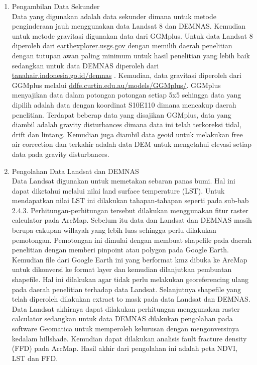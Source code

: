 \begin{enumerate}
	\item Pengambilan Data Sekunder\\
	Data yang digunakan adalah data sekunder dimana untuk metode penginderaan jauh menggunakan data Landsat 8 dan DEMNAS. Kemudian untuk metode gravitasi digunakan data dari GGMplus. Untuk data Landsat 8 diperoleh dari \href{earthexplorer.usgs.gov }{earthexplorer.usgs.gov } dengan memilih daerah penelitian dengan tutupan awan paling minimum untuk hasil penelitian yang lebih baik sedangkan untuk data DEMNAS diperoleh dari \href{tanahair.indonesia.go.id/demnas}{tanahair.indonesia.go.id/demnas} . Kemudian, data gravitasi diperoleh dari GGMplus melalui \href{ddfe.curtin.edu.au/models/GGMplus/}{ddfe.curtin.edu.au/models/GGMplus/}. GGMplus menyajikan data dalam potongan potongan setiap 5x5 sehingga data yang dipilih adalah data dengan koordinat S10E110 dimana mencakup daerah penelitian. Terdapat beberap data yang disajikan GGMplus, data yang diambil adalah gravity disturbances dimana data ini telah terkoreksi tidal, drift dan lintang. Kemudian juga diambil data geoid untuk melakukan free air correction dan terkahir adalah data DEM untuk mengetahui elevasi setiap data pada gravity disturbances.
	\vskip 5pt
	\item Pengolahan Data Landsat dan DEMNAS\\
	Data Landsat digunakan untuk memetakan sebaran panas bumi. Hal ini dapat diketahui melalui nilai land surface temperature (LST).  Untuk mendapatkan nilai LST ini dilakukan tahapan-tahapan seperti pada sub-bab 2.4.3. Perhitungan-perhitungan tersebut dilakukan menggunakan fitur raster calculator pada ArcMap. Sebelum itu data dan Landsat dan DEMNAS masih berupa cakupan willayah yang lebih luas sehingga perlu dilakukan pemotongan. Pemotongan ini dimulai dengan membuat shapefile pada daerah penelitian dengan memberi pinpoint atau polygon pada Google Earth. Kemudian file dari Google Earth ini yang berformat kmz dibuka ke ArcMap untuk dikonversi ke format layer dan kemudian dilanjutkan pembuatan shapefile. Hal ini dilakukan agar tidak perlu melakukan georeferencing ulang pada daerah penelitian terhadap data Landsat. Selanjutnya shapefile yang telah diperoleh dilakukan extract to mask pada data Landsat dan DEMNAS. Data Landsat akhirnya dapat dilakukan perhitungan menggunakan raster calculator sedangkan untuk data DEMNAS dilakukan pengolahan pada software Geomatica untuk memperoleh kelurusan dengan mengonversinya kedalam hillshade. Kemudian dapat dilakukan analisis fault fracture density (FFD) pada ArcMap. Hasil akhir dari pengolahan ini adalah peta NDVI, LST dan FFD.

\end{enumerate}
